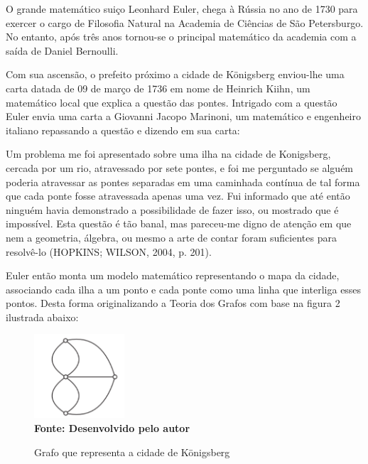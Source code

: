 O grande matemático suiço Leonhard Euler, chega à Rússia no ano de 1730 para exercer o cargo de Filosofia Natural na Academia de Ciências de São Petersburgo. No entanto, após três anos tornou-se o principal matemático da academia com a saída de Daniel Bernoulli.

Com sua ascensão, o prefeito próximo a cidade de Königsberg enviou-lhe uma carta datada de 09 de março de 1736 em nome de Heinrich Kiihn, um matemático local que explica a questão das pontes. Intrigado com a questão Euler envia uma carta a Giovanni Jacopo Marinoni, um matemático e engenheiro italiano repassando a questão e dizendo em sua carta:

\begin{citacaodireta}
Um problema me foi apresentado sobre uma ilha na cidade de Konigsberg, cercada por um rio, atravessado por sete pontes, e foi me perguntado se alguém poderia atravessar as pontes separadas em uma caminhada contínua de tal forma que cada ponte fosse atravessada apenas uma vez. Fui informado que até então ninguém havia demonstrado a possibilidade de fazer isso, ou mostrado que é impossível. Esta questão é tão banal, mas pareceu-me digno de atenção em que nem a geometria, álgebra, ou mesmo a arte de contar foram suficientes para resolvê-lo (HOPKINS; WILSON, 2004, p. 201).
\end{citacaodireta}

Euler então monta um modelo matemático representando o mapa da cidade, associando cada ilha a um ponto e cada ponte como uma linha que interliga esses pontos.  Desta forma originalizando a Teoria dos Grafos com base na figura 2 ilustrada abaixo:

\begin{figure}[ht]
	\centering	
	\caption[\hspace{0.1cm}Grafo que representa a cidade de Königsberg.]{Grafo que representa a cidade de Königsberg}
	\vspace{-0.4cm}
	\includegraphics[width=0.3\textwidth]{figuras/grafo-cidade.png}
	 \vspace{-0.2cm}
	\\\textbf{\footnotesize Fonte: Desenvolvido pelo autor}
	\label{fig:figura1}
\end{figure}


